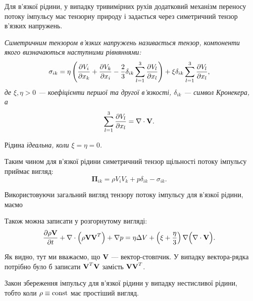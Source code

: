 Для в'язкої рідини, у випадку тривимірних рухів додатковий механізм переносу потоку імпульсу має тензорну природу і задається через симетричний тензор в'язких напружень.

\begin{definition}
	\it{Симетричним тензором в'язких напружень} називається тензор, компоненти якого визначаються наступними рівняннями: 
	\begin{equation}
		\sigma_{ik} = \eta \left( \frac{\partial V_i}{\partial x_k} + \frac{\partial V_k}{\partial x_i} - \frac{2}{3} \delta_{ik} \Sum_{l = 1}^3 \frac{\partial V_l}{\partial x_l}\right) + \xi \delta_{ik} \Sum_{l = 1}^3 \frac{\partial V_l}{\partial x_l},
	\end{equation}
	де $\xi, \eta > 0$ --- коефіцієнти першої та другої в'язкості, $\delta_{ik}$ --- символ Кронекера, а
	\begin{equation}
		\Sum_{l = 1}^3 \frac{\partial V_l}{\partial x_l} = \nabla \cdot \bf{V}.
	\end{equation}
\end{definition}

\begin{remark}
	Рідина \it{ідеальна}, коли $\xi = \eta = 0$.
\end{remark}

Таким чином для в'язкої рідини симетричний тензор щільності потоку імпульсу приймає вигляд:
\begin{equation}
	\bm{\Pi}_{ik} = \rho V_i V_k + p \delta_{ik} - \sigma_{ik}.
\end{equation}

Використовуючи загальний вигляд тензору потоку імпульсу для в'язкої рідини, маємо
\begin{law}
	Також можна записати у розгорнутому вигляді:
	\begin{equation}
		\frac{\partial \rho \bf{V}}{\partial t} + \nabla \cdot \Big(\rho \bf{V} \bf{V}^T\Big) + \nabla p = \eta \Delta V + \left( \xi + \frac{\eta}{3} \right) \nabla \Big(\nabla \cdot \bf{V}\Big).
	\end{equation}
\end{law}

\begin{remark}
	Як видно, тут ми вважаємо, що $\bf{V}$ --- вектор-стовпчик. У випадку вектора-рядка потрібно було б записати $\bf{V}^T \bf{V}$ замість $\bf{V} \bf{V}^T$.
\end{remark}

\begin{remark}
	Закон збереження імпульсу для в'язкої рідини у випадку нестисливої рідини, тобто коли $\rho \equiv \const$ має простіший вигляд.
\end{remark}
	
